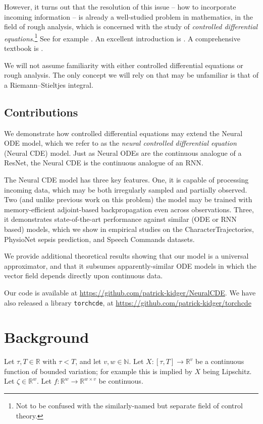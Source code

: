 \documentclass{article}
\theoremstyle{plain}
\theoremstyle{definition}
\newcommand{\reals}{\mathbb{R}}
\newcommand{\naturals}{\mathbb{N}}
\begin{document}
	However, it turns out that the resolution of this issue -- how to incorporate incoming information -- is already a well-studied problem in mathematics, in the field of rough analysis, which is concerned with the study of \emph{controlled differential equations}.\footnote{Not to be confused with the similarly-named but separate field of control theory.} See for example \cite{lyons1998differential, lyons2014rough, hambly2010uniqueness, chevyrev2018signature}. An excellent introduction is \cite{levy-lyons}. A comprehensive textbook is \cite{FritzVictoir10}.
	
	We will not assume familiarity with either controlled differential equations or rough analysis. The only concept we will rely on that may be unfamiliar is that of a Riemann--Stieltjes integral.
	
	\subsection{Contributions}
	We demonstrate how controlled differential equations may extend the Neural ODE model, which we refer to as the \emph{neural controlled differential equation} (Neural CDE) model. Just as Neural ODEs are the continuous analogue of a ResNet, the Neural CDE is the continuous analogue of an RNN.
	
	The Neural CDE model has three key features. One, it is capable of processing incoming data, which may be both irregularly sampled and partially observed. Two (and unlike previous work on this problem) the model may be trained with memory-efficient adjoint-based backpropagation even across observations. Three, it demonstrates state-of-the-art performance against similar (ODE or RNN based) models, which we show in empirical studies on the CharacterTrajectories, PhysioNet sepsis prediction, and Speech Commands datasets.

	We provide additional theoretical results showing that our model is a universal approximator, and that it subsumes apparently-similar ODE models in which the vector field depends directly upon continuous data.
	
	Our code is available at \url{https://github.com/patrick-kidger/NeuralCDE}. We have also released a library \texttt{torchcde}, at \url{https://github.com/patrick-kidger/torchcde}
	
	\section{Background}
	Let $\tau, T \in \reals$ with $\tau < T$, and let $v, w \in \naturals$. Let $X \colon [\tau, T] \to \reals^v$ be a continuous function of bounded variation; for example this is implied by $X$ being Lipschitz. Let $\zeta \in \reals^w$. Let $f \colon \reals^w \to \reals^{w \times v}$ be continuous.
	
\end{document}
